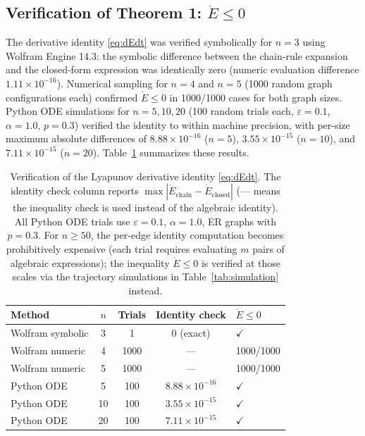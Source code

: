 \documentclass[3p]{elsarticle}
\begin{document}
\subsection{Verification of Theorem 1: $\dot E \le 0$}

The derivative identity \eqref{eq:dEdt} was verified symbolically for $n=3$ using Wolfram Engine 14.3: the symbolic difference between the chain-rule expansion and the closed-form expression was identically zero (numeric evaluation difference $1.11\times10^{-16}$). Numerical sampling for $n=4$ and $n=5$ (1000 random graph configurations each) confirmed $\dot E \le 0$ in 1000/1000 cases for both graph sizes. Python ODE simulations for $n=5,10,20$ (100 random trials each, $\varepsilon=0.1$, $\alpha=1.0$, $p=0.3$) verified the identity to within machine precision, with per-size maximum absolute differences of $8.88\times10^{-16}$ ($n=5$), $3.55\times10^{-15}$ ($n=10$), and $7.11\times10^{-15}$ ($n=20$). Table~\ref{tab:verification} summarizes these results.

\begin{table}[ht]
\centering
\caption{Verification of the Lyapunov derivative identity \eqref{eq:dEdt}. The identity check column reports $\max|\dot E_{\text{chain}} - \dot E_{\text{closed}}|$ (--- means the inequality check is used instead of the algebraic identity). All Python ODE trials use $\varepsilon=0.1$, $\alpha=1.0$, ER graphs with $p=0.3$. For $n\ge50$, the per-edge identity computation becomes prohibitively expensive (each trial requires evaluating $m$ pairs of algebraic expressions); the inequality $\dot E\le0$ is verified at those scales via the trajectory simulations in Table~\ref{tab:simulation} instead.}
\label{tab:verification}
\begin{tabular}{lcccl}
\toprule
\textbf{Method} & \textbf{$n$} & \textbf{Trials} & \textbf{Identity check} & \textbf{$\dot E \le 0$}\\
\midrule
Wolfram symbolic & 3 & 1 & $0$ (exact) & $\checkmark$ \\
Wolfram numeric  & 4 & 1000 & --- & 1000/1000 \\
Wolfram numeric  & 5 & 1000 & --- & 1000/1000 \\
Python ODE       & 5 & 100 & $8.88\times10^{-16}$ & $\checkmark$ \\
Python ODE       & 10 & 100 & $3.55\times10^{-15}$ & $\checkmark$ \\
Python ODE       & 20 & 100 & $7.11\times10^{-15}$ & $\checkmark$ \\
\bottomrule
\end{tabular}
\end{table}
\end{document}
